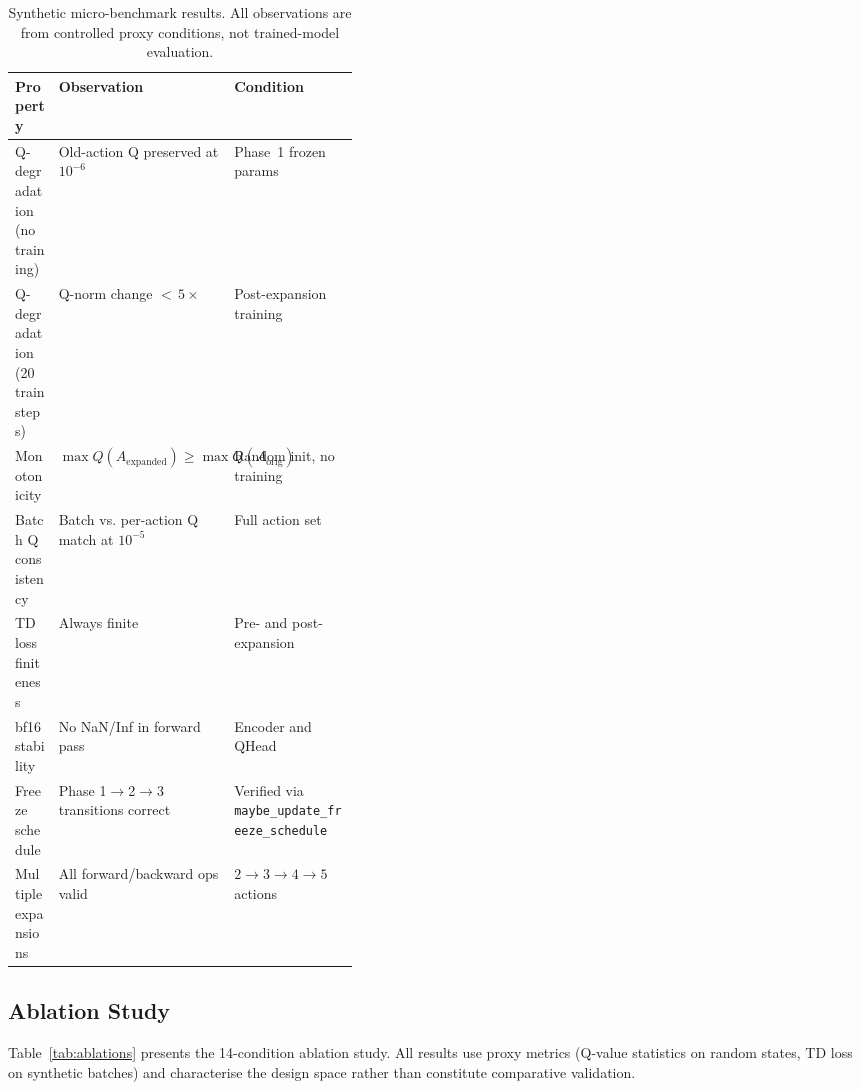 \documentclass{article}
\begin{document}
\begin{table}[h]
  \centering
  \caption{Synthetic micro-benchmark results. All observations are from
  controlled proxy conditions, not trained-model evaluation.}
  \label{tab:benchmarks}
  \begin{tabular}{lp{0.4\linewidth}l}
    \toprule
    \textbf{Property} & \textbf{Observation} & \textbf{Condition} \\
    \midrule
    Q-degradation (no training) &
      Old-action Q preserved at $10^{-6}$ &
      Phase~1 frozen params \\
    Q-degradation (20 train steps) &
      Q-norm change ${<}\,5\times$ &
      Post-expansion training \\
    Monotonicity &
      $\max Q(A_\text{expanded}) \geq \max Q(A_\text{orig})$ &
      Random init, no training \\
    Batch Q consistency &
      Batch vs. per-action Q match at $10^{-5}$ &
      Full action set \\
    TD loss finiteness &
      Always finite &
      Pre- and post-expansion \\
    bf16 stability &
      No NaN/Inf in forward pass &
      Encoder and QHead \\
    Freeze schedule &
      Phase 1$\to$2$\to$3 transitions correct &
      Verified via
      \texttt{maybe\_update\_freeze\_schedule} \\
    Multiple expansions &
      All forward/backward ops valid &
      $2 \to 3 \to 4 \to 5$ actions \\
    \bottomrule
  \end{tabular}
\end{table}

\subsection{Ablation Study}

Table~\ref{tab:ablations} presents the 14-condition ablation study. All
results use proxy metrics (Q-value statistics on random states, TD loss on
synthetic batches) and characterise the design space rather than constitute
comparative validation.
\end{document}

